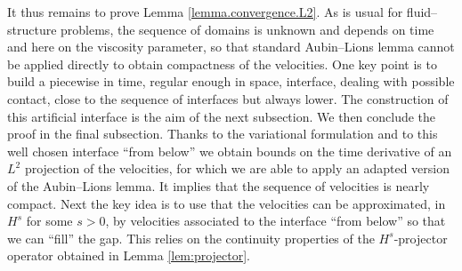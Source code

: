 \documentclass[11pt]{article}
\theoremstyle{remark}
\theoremstyle{definition}
\begin{document}
It thus remains to prove Lemma \ref{lemma.convergence.L2}. As is usual for fluid--structure problems, the sequence of domains is unknown and depends on time and here on the viscosity parameter, so that standard Aubin--Lions lemma cannot be applied directly to obtain compactness of the velocities. One key point is to build a piecewise in time, regular enough in space, interface, dealing with possible contact, close to the sequence of interfaces but always lower. The construction of this artificial interface is the aim of the next subsection. We then conclude the proof in the final subsection. Thanks to the variational formulation and to this well chosen interface ``from below'' we obtain bounds on the time derivative of an $L^2$ projection of the velocities, for which we are able to apply an adapted version of the Aubin--Lions lemma. It implies that the sequence of velocities is nearly compact. Next the key idea is to use that the velocities can be approximated, in $H^s$ for some $s>0$, by velocities associated to the interface ``from below'' so that we can ``fill'' the gap. This relies on the continuity properties of the $H^s$-projector operator obtained in Lemma \ref{lem:projector}.
\end{document}
